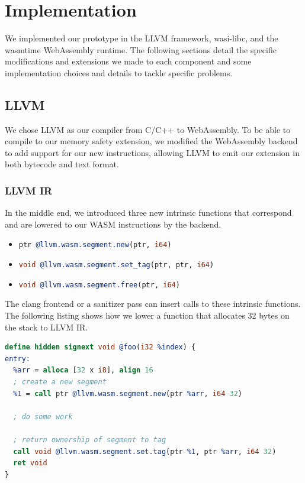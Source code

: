 \chapter{Implementation}
\label{ch:implementation}

We implemented our prototype in the LLVM framework, wasi-libc, and the wasmtime WebAssembly runtime.
The following sections detail the specific modifications and extensions we made to each component and some implementation choices and details to tackle specific problems.

\section{LLVM}
\label{sec:llvm}

We chose LLVM as our compiler from C/C++ to WebAssembly.
To be able to compile to our memory safety extension, we modified the WebAssembly backend to add support for our new instructions, allowing LLVM to emit our extension in both bytecode and text format.

\subsection{LLVM IR}
\label{subsec:llvm-ir}

In the middle end, we introduced three new intrinsic functions that correspond and are lowered to our \ac{WASM} instructions by the backend.
\begin{itemize}
  \item \lstinline[style=customc,language=llvm]{ptr @llvm.wasm.segment.new(ptr, i64)}
  \item \lstinline[style=customc,language=llvm]{void @llvm.wasm.segment.set_tag(ptr, ptr, i64)}
  \item \lstinline[style=customc,language=llvm]{void @llvm.wasm.segment.free(ptr, i64)}
\end{itemize}
The clang frontend or a sanitizer pass can insert calls to these intrinsic functions.
The following listing shows how we lower a function that allocates 32 bytes on the stack to LLVM IR.

\begin{lstlisting}[frame=h,style=customc,
  label={lst:llvm-intrinsics},language=llvm]
define hidden signext void @foo(i32 %index) {
entry:
  %arr = alloca [32 x i8], align 16
  ; create a new segment
  %1 = call ptr @llvm.wasm.segment.new(ptr %arr, i64 32)

  ; do some work

  ; return ownership of segment to tag
  call void @llvm.wasm.segment.set.tag(ptr %1, ptr %arr, i64 32)
  ret void
}
\end{lstlisting}

